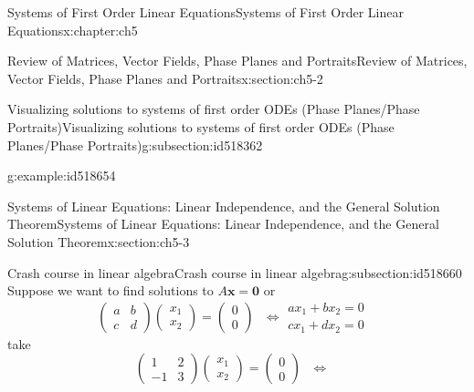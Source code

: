 \documentclass[oneside,10pt,]{book}
\numberwithin{equation}{section}
\numberwithin{equation}{section}
\newcommand{\amp}{&}
\begin{document}
\begin{chapterptx}{Systems of First Order Linear Equations}{}{Systems of First Order Linear Equations}{}{}{x:chapter:ch5}
\begin{sectionptx}{Review of Matrices, Vector Fields, Phase Planes and Portraits}{}{Review of Matrices, Vector Fields, Phase Planes and Portraits}{}{}{x:section:ch5-2}
\begin{subsectionptx}{Visualizing solutions to systems of first order ODEs (Phase Planes\slash{}Phase Portraits)}{}{Visualizing solutions to systems of first order ODEs (Phase Planes\slash{}Phase Portraits)}{}{}{g:subsection:id518362}
\begin{example}{}{g:example:id518654}
\begin{image}{0}{1}{0}
\end{image}%
%
\end{example}
\end{subsectionptx}
\end{sectionptx}
%
%
\typeout{************************************************}
\typeout{************************************************}
%
\begin{sectionptx}{Systems of Linear Equations: Linear Independence, and the General Solution Theorem}{}{Systems of Linear Equations: Linear Independence, and the General Solution Theorem}{}{}{x:section:ch5-3}
%
%
\typeout{************************************************}
\typeout{************************************************}
%
\begin{subsectionptx}{Crash course in linear algebra}{}{Crash course in linear algebra}{}{}{g:subsection:id518660}
Suppose we want to find solutions to \(A\mathbf{x}=\mathbf{0}\) or%
\begin{equation*}
\left(\begin{array}{cc}
a \amp b\\
c \amp  d
\end{array}\right)\left(\begin{array}{c}
x_{1}\\
x_{2}
\end{array}\right)=\left(\begin{array}{c}
0\\
0
\end{array}\right)\mbox{ }\iff\begin{array}{c}
ax_{1}+bx_{2}=0\\
cx_{1}+dx_{2}=0
\end{array}\mbox{ }
\end{equation*}
take%
\begin{equation*}
\left(\begin{array}{cc}
1 \amp  2\\
-1 \amp 3
\end{array}\right)\left(\begin{array}{c}
x_{1}\\
x_{2}
\end{array}\right)=\left(\begin{array}{c}
0\\
0
\end{array}\right)\mbox{ }\iff\begin{array}{c}

\end{array}
\end{equation*}
\end{subsectionptx}
\end{sectionptx}
\end{chapterptx}
\end{document}
